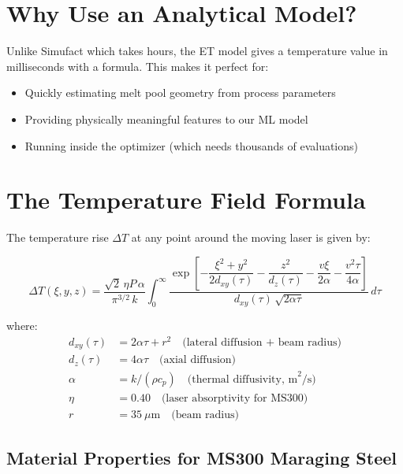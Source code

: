 \documentclass[12pt,a4paper]{report}
\begin{document}
\section{Why Use an Analytical Model?}

Unlike Simufact which takes hours, the ET model gives a temperature value in milliseconds with a formula. This makes it perfect for:
\begin{itemize}
  \item Quickly estimating melt pool geometry from process parameters
  \item Providing physically meaningful features to our ML model
  \item Running inside the optimizer (which needs thousands of evaluations)
\end{itemize}

\section{The Temperature Field Formula}

The temperature rise $\Delta T$ at any point around the moving laser is given by:

\begin{equation}
\Delta T(\xi, y, z) = \frac{\sqrt{2}\,\eta P\,\alpha}{\pi^{3/2}\,k}
\int_0^{\infty}
\frac{\exp\!\left[
  -\dfrac{\xi^2 + y^2}{2d_{xy}(\tau)}
  - \dfrac{z^2}{d_z(\tau)}
  - \dfrac{v\xi}{2\alpha}
  - \dfrac{v^2\tau}{4\alpha}
\right]}{d_{xy}(\tau)\,\sqrt{2\alpha\tau}}
\,d\tau
\label{eq:eagar_tsai}
\end{equation}

where:
\begin{align*}
d_{xy}(\tau) &= 2\alpha\tau + r^2 \quad \text{(lateral diffusion + beam radius)}\\
d_z(\tau) &= 4\alpha\tau \quad \text{(axial diffusion)}\\
\alpha &= k/(\rho c_p) \quad \text{(thermal diffusivity, m}^2/\text{s)}\\
\eta &= 0.40 \quad \text{(laser absorptivity for MS300)}\\
r &= 35~\mu\text{m} \quad \text{(beam radius)}
\end{align*}

\subsection{Material Properties for MS300 Maraging Steel}
\end{document}
